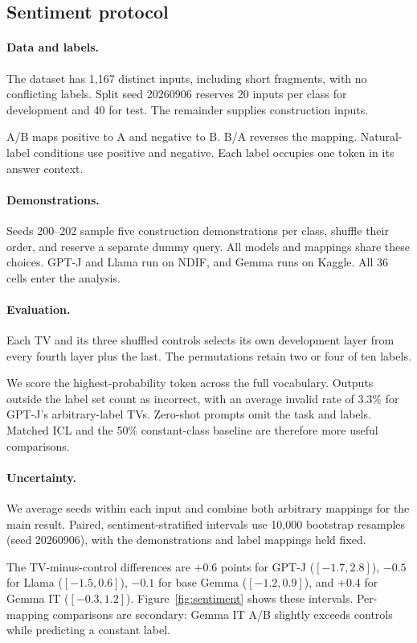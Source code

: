 \documentclass[11pt]{article}
\begin{document}
\subsection{Sentiment protocol}

\paragraph{Data and labels.} The dataset has 1,167 distinct inputs, including short fragments, with no conflicting labels. Split seed 20260906 reserves 20 inputs per class for development and 40 for test. The remainder supplies construction inputs.

A/B maps positive to A and negative to B. B/A reverses the mapping. Natural-label conditions use positive and negative. Each label occupies one token in its answer context.

\paragraph{Demonstrations.} Seeds 200--202 sample five construction demonstrations per class, shuffle their order, and reserve a separate dummy query. All models and mappings share these choices. GPT-J and Llama run on NDIF, and Gemma runs on Kaggle. All 36 cells enter the analysis.

\paragraph{Evaluation.} Each TV and its three shuffled controls selects its own development layer from every fourth layer plus the last. The permutations retain two or four of ten labels.

We score the highest-probability token across the full vocabulary. Outputs outside the label set count as incorrect, with an average invalid rate of 3.3\% for GPT-J's arbitrary-label TVs. Zero-shot prompts omit the task and labels. Matched ICL and the 50\% constant-class baseline are therefore more useful comparisons.

\paragraph{Uncertainty.} We average seeds within each input and combine both arbitrary mappings for the main result. Paired, sentiment-stratified intervals use 10,000 bootstrap resamples (seed 20260906), with the demonstrations and label mappings held fixed.

The TV-minus-control differences are $+0.6$ points for GPT-J ($[-1.7,2.8]$), $-0.5$ for Llama ($[-1.5,0.6]$), $-0.1$ for base Gemma ($[-1.2,0.9]$), and $+0.4$ for Gemma IT ($[-0.3,1.2]$). Figure~\ref{fig:sentiment} shows these intervals. Per-mapping comparisons are secondary: Gemma IT A/B slightly exceeds controls while predicting a constant label.
\end{document}
